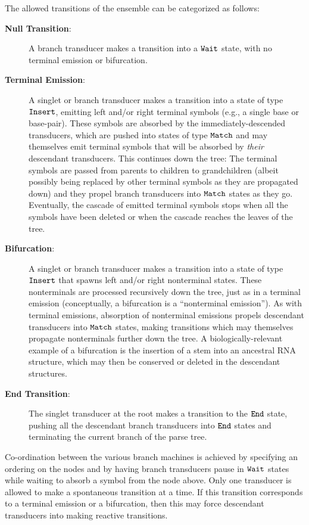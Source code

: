 \documentclass[10pt]{article}
\begin{document}
The allowed transitions of the ensemble can be categorized as follows:
\begin{description}
\item[{\bf Null Transition}:]
  A branch transducer makes a transition into a $\mathtt{Wait}$ state, with no terminal emission or bifurcation.
\item[{\bf Terminal Emission}:]
  A singlet or branch transducer makes a transition into a state of type $\mathtt{Insert}$,
  emitting left and/or right terminal symbols (e.g., a single base or base-pair).
  These symbols are absorbed by the immediately-descended transducers,
  which are pushed into states of type $\mathtt{Match}$
  and may themselves emit terminal symbols
  that will be absorbed by {\em their} descendant transducers.
  This continues down the tree: The terminal symbols are passed from parents to children to grandchildren
  (albeit possibly being replaced by other terminal symbols as they
  are propagated down)
  and they propel branch transducers into $\mathtt{Match}$ states as they go.
  Eventually, the cascade of emitted terminal symbols stops when all the symbols have been deleted
  or when the cascade reaches the leaves of the tree.
\item[{\bf Bifurcation}:]
  A singlet or branch transducer makes a transition into a state of type $\mathtt{Insert}$ that spawns
  left and/or right nonterminal states.
  These nonterminals are processed recursively down the tree, just as in a
  terminal emission (conceptually, a bifurcation is a ``nonterminal emission'').
  As with terminal emissions, absorption of nonterminal emissions propels
  descendant transducers into $\mathtt{Match}$ states,
  making transitions which may themselves propagate nonterminals
  further down the tree.
  A biologically-relevant example of a bifurcation is the insertion of a stem
  into an ancestral RNA structure,
  which may then be conserved or deleted in the descendant structures.
\item[{\bf End Transition}:]
  The singlet transducer at the root makes a transition to the $\mathtt{End}$ state,
  pushing all the descendant branch transducers into $\mathtt{End}$ states and
  terminating the current branch of the parse tree.
\end{description}

Co-ordination between the various branch machines is achieved by
specifying an ordering on the nodes and by having branch transducers pause in $\mathtt{Wait}$
states while waiting to absorb a symbol from the node above.  
Only one transducer is allowed to make a spontaneous transition at a
time. If this transition corresponds to a terminal
emission or a bifurcation, then this may force descendant transducers
into making reactive transitions.
\end{document}
